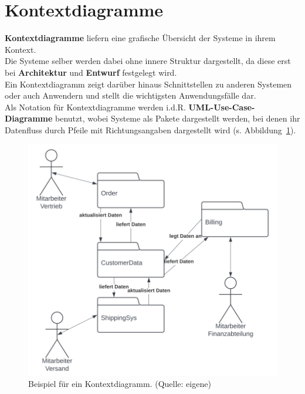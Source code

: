 \section{Kontextdiagramme}

\textbf{Kontextdiagramme} liefern eine grafische Übersicht der Systeme in ihrem Kontext.\\
Die Systeme selber werden dabei ohne innere Struktur dargestellt, da diese erst bei \textbf{Architektur} und \textbf{Entwurf} festgelegt wird.\\
Ein Kontextdiagramm zeigt darüber hinaus Schnittstellen zu anderen Systemen oder auch Anwendern und stellt die wichtigsten Anwendungsfälle dar.\\

\noindent
Als Notation für Kontextdiagramme werden i.d.R. \textbf{UML-Use-Case-Diagramme} benutzt, wobei Systeme als Pakete dargestellt werden, bei denen ihr Datenfluss durch Pfeile mit Richtungsangaben dargestellt wird (s. Abbildung~\ref{fig:usecaseexample}).

\begin{figure}
    \centering
    \includegraphics[scale=0.4]{part one/Requirements Engineering/img/usecaseexample}
    \caption{Beispiel für ein Kontextdiagramm. (Quelle: eigene)}
    \label{fig:usecaseexample}
\end{figure}
